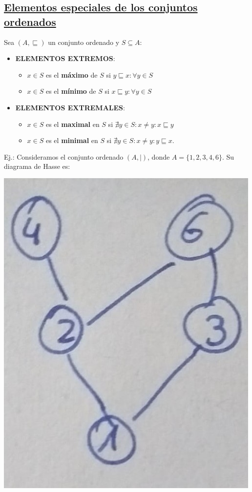 \documentclass[10pt,a4paper,openright]{book}
\begin{document}
\subsection*{\underline{Elementos especiales de los conjuntos ordenados}}
Sea $(A,\sqsubseteq )$ un conjunto ordenado y $S\subseteq A$:
\begin{itemize}
\item \textbf{ELEMENTOS EXTREMOS}:
	\begin{itemize}
	\item $x\in S$ es el \textbf{máximo} de $S$ si $y\sqsubseteq x: \forall y\in S$
	
	\item $x\in S$ es el \textbf{mínimo} de $S$ si $x\sqsubseteq y: \forall y\in S$
	\end{itemize}
	
\item \textbf{ELEMENTOS EXTREMALES}:
	\begin{itemize}
	\item $x\in S$ es el \textbf{maximal} en $S$ si $\nexists y \in S: x\neq y: x\sqsubseteq y$
	
	\item $x\in S$ es el \textbf{minimal} en $S$ si $\nexists y \in S: x\neq y: y\sqsubseteq x$.
	\end{itemize}
\end{itemize}

Ej.: Consideramos el conjunto ordenado $(A,\mid)$, donde $A=\{1,2,3,4,6\}$. Su diagrama de Hasse es:
\begin{center}
\includegraphics[scale=0.15]{Diagrama de Hasse2}
\end{center}
\end{document}
